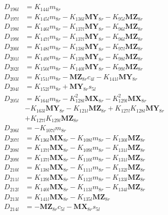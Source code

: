 \begin{align}
 \nonumber \\ 
D_{196l} &= K_{144l}m_{8r} \nonumber \\
D_{197l} &= K_{145l}m_{8r} - K_{136l}\mathbf{MY}_{8r} - K_{95l}\mathbf{MZ}_{8r} \nonumber \\
D_{198l} &= K_{146l}m_{8r} - K_{137l}\mathbf{MY}_{8r} - K_{96l}\mathbf{MZ}_{8r} \nonumber \\
D_{199l} &= K_{147l}m_{8r} - K_{137l}\mathbf{MY}_{8r} - K_{96l}\mathbf{MZ}_{8r} \nonumber \\
D_{200l} &= K_{148l}m_{8r} - K_{138l}\mathbf{MY}_{8r} - K_{97l}\mathbf{MZ}_{8r} \nonumber \\
D_{201l} &= K_{149l}m_{8r} - K_{139l}\mathbf{MY}_{8r} - K_{98l}\mathbf{MZ}_{8r} \nonumber \\
D_{202l} &= K_{150l}m_{8r} - K_{140l}\mathbf{MY}_{8r} - K_{99l}\mathbf{MZ}_{8r} \nonumber \\
D_{203l} &= K_{151l}m_{8r} - \mathbf{MZ}_{8r}c_{4l} - K_{141l}\mathbf{MY}_{8r} \nonumber \\
D_{204l} &= K_{152l}m_{8r} + \mathbf{MY}_{8r}s_{5l} \nonumber \\
D_{205l} &= K_{164l}m_{8r} - K_{128l}^2\mathbf{MX}_{8r} - K_{129l}^2\mathbf{MX}_{8r}  \nonumber \\
&- K_{163l}\mathbf{MY}_{8r} - K_{121l}\mathbf{MZ}_{8r} + K_{127l}K_{128l}\mathbf{MY}_{8r}  \nonumber \\
&+ K_{127l}K_{129l}\mathbf{MZ}_{8r} \nonumber \\
D_{206l} &= -K_{107l}m_{8r} \nonumber \\
D_{207l} &= K_{136l}\mathbf{MX}_{8r} - K_{108l}m_{8r} - K_{130l}\mathbf{MZ}_{8r} \nonumber \\
D_{208l} &= K_{137l}\mathbf{MX}_{8r} - K_{109l}m_{8r} - K_{131l}\mathbf{MZ}_{8r} \nonumber \\
D_{209l} &= K_{137l}\mathbf{MX}_{8r} - K_{110l}m_{8r} - K_{131l}\mathbf{MZ}_{8r} \nonumber \\
D_{210l} &= K_{138l}\mathbf{MX}_{8r} - K_{111l}m_{8r} - K_{132l}\mathbf{MZ}_{8r} \nonumber \\
D_{211l} &= K_{139l}\mathbf{MX}_{8r} - K_{112l}m_{8r} - K_{133l}\mathbf{MZ}_{8r} \nonumber \\
D_{212l} &= K_{140l}\mathbf{MX}_{8r} - K_{113l}m_{8r} - K_{134l}\mathbf{MZ}_{8r} \nonumber \\
D_{213l} &= K_{141l}\mathbf{MX}_{8r} - K_{135l}\mathbf{MZ}_{8r} \nonumber \\
D_{214l} &= - \mathbf{MZ}_{8r}c_{5l} - \mathbf{MX}_{8r}s_{5l} \nonumber \\

\end{align}
